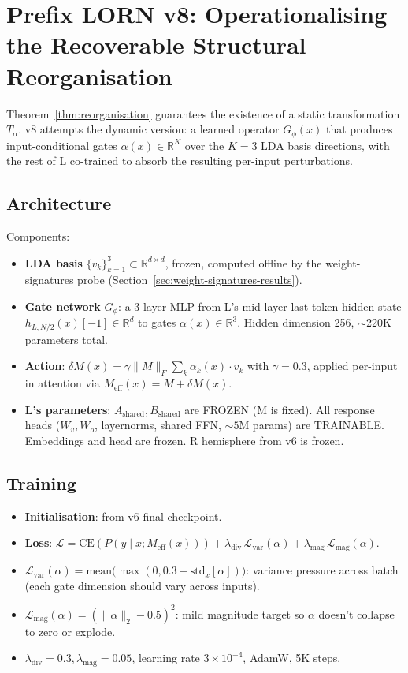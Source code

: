 \documentclass[11pt, a4paper]{article}
\theoremstyle{plain}
\theoremstyle{definition}
\theoremstyle{remark}
\begin{document}
\section{Prefix LORN v8: Operationalising the Recoverable Structural Reorganisation}
\label{sec:v8-design}

Theorem~\ref{thm:reorganisation} guarantees the existence of a static transformation $T_\alpha$.
v8 attempts the dynamic version: a learned operator $G_\phi(x)$ that produces input-conditional gates $\alpha(x) \in \mathbb{R}^{K}$ over the $K = 3$ LDA basis directions, with the rest of L co-trained to absorb the resulting per-input perturbations.

\subsection{Architecture}

Components:
\begin{itemize}[nosep]
\item \textbf{LDA basis} $\{v_k\}_{k=1}^{3} \subset \mathbb{R}^{d \times d}$, frozen, computed offline by the weight-signatures probe (Section~\ref{sec:weight-signatures-results}).
\item \textbf{Gate network} $G_\phi$: a 3-layer MLP from L's mid-layer last-token hidden state $h_{L,N/2}(x)[-1] \in \mathbb{R}^{d}$ to gates $\alpha(x) \in \mathbb{R}^{3}$. Hidden dimension 256, $\sim$220K parameters total.
\item \textbf{Action}: $\delta M(x) = \gamma \|M\|_F \sum_k \alpha_k(x) \cdot v_k$ with $\gamma = 0.3$, applied per-input in attention via $M_{\text{eff}}(x) = M + \delta M(x)$.
\item \textbf{L's parameters}: $A_{\text{shared}}, B_{\text{shared}}$ are FROZEN (M is fixed). All response heads ($W_v, W_o$, layernorms, shared FFN, $\sim 5$M params) are TRAINABLE. Embeddings and head are frozen. R hemisphere from v6 is frozen.
\end{itemize}

\subsection{Training}

\begin{itemize}[nosep]
\item \textbf{Initialisation}: from v6 final checkpoint.
\item \textbf{Loss}: $\mathcal{L} = \mathrm{CE}(P(y \mid x; M_{\text{eff}}(x))) + \lambda_{\text{div}}\, \mathcal{L}_{\text{var}}(\alpha) + \lambda_{\text{mag}}\, \mathcal{L}_{\text{mag}}(\alpha)$.
\item $\mathcal{L}_{\text{var}}(\alpha) = \mathrm{mean}\!\big(\max(0, 0.3 - \mathrm{std}_{x}[\alpha])\big)$: variance pressure across batch (each gate dimension should vary across inputs).
\item $\mathcal{L}_{\text{mag}}(\alpha) = (\|\alpha\|_2 - 0.5)^2$: mild magnitude target so $\alpha$ doesn't collapse to zero or explode.
\item $\lambda_{\text{div}} = 0.3, \lambda_{\text{mag}} = 0.05$, learning rate $3 \times 10^{-4}$, AdamW, 5K steps.
\end{itemize}
\end{document}
